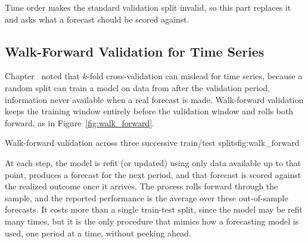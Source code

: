 \documentclass[../ai_in_finance]{subfiles}
\begin{document}
Time order makes the standard validation split invalid, so this part replaces it and asks what a forecast should be scored against.

\subsection{Walk-Forward Validation for Time Series}

Chapter~ noted that $k$-fold cross-validation can mislead for time series, because a random split can train a model on data from after the validation period, information never available when a real forecast is made. Walk-forward validation keeps the training window entirely before the validation window and rolls both forward, as in Figure~\ref{fig:walk_forward}.

\begin{bookfigure}[htbp]{Walk-forward validation across three successive train/test splits}{fig:walk_forward}
\end{bookfigure}

At each step, the model is refit (or updated) using only data available up to that point, produces a forecast for the next period, and that forecast is scored against the realized outcome once it arrives. The process rolls forward through the sample, and the reported performance is the average over these out-of-sample forecasts. It costs more than a single train-test split, since the model may be refit many times, but it is the only procedure that mimics how a forecasting model is used, one period at a time, without peeking ahead.
\end{document}
